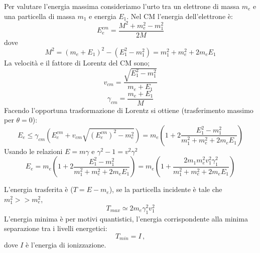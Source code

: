 \documentclass[twoside]{article}
\begin{document}
Per valutare l'energia massima consideriamo l'urto tra un elettrone di massa $m_e$ e una particella di massa $m_1$ e energia $E_1$. Nel CM l'energia dell'elettrone è:
\begin{equation}
    E_e^{cm}=\frac{M^2+m_e^2-m_1^2}{2M}
\end{equation}
dove
\begin{equation*}
    M^2=(m_e+E_1)^2-(E_1^2-m_1^2)=m_1^2+m_e^2+2m_eE_1
\end{equation*}
La velocità e il fattore di Lorentz del CM sono;
\begin{equation}
    v_{cm}=\frac{\sqrt{E_1^2-m_1^2}}{m_e+E_1}
\end{equation}
\begin{equation}
    \gamma_{cm}=\frac{m_e+E_1}{M}
\end{equation}
Facendo l'opportuna trasformazione di Lorentz si ottiene (trasferimento massimo per $\theta=0$):
\begin{equation}
    E_e \le \gamma_{cm} (E_e^{cm}+ v_{cm}\sqrt{(E_e^{cm})^2-m_e^2})=m_e \left( 1+ 2\frac{E_1^2-m_1^2}{m_1^2+m_e^2+2m_eE_1} \right)
\end{equation}
Usando le relazioni $E=m\gamma$ e $\gamma^2-1=v^2\gamma^2$
\begin{equation}
    E_e= m_e \left( 1+ 2\frac{E_1^2-m_1^2}{m_1^2+m_e^2+2m_eE_1} \right) = m_e \left( 1+ \frac{2m_1m_e^2v_1^2\gamma_1^2}{m_1^2+m_e^2+2m_eE_1}  \right)
\end{equation}

L'energia trasferita è ($T=E-m_e$), se la particella incidente è tale che $m_1^2>>m_e^2$, 
\begin{equation}
    T_{max}\simeq 2m_e \gamma_1^2 v_1^2
\end{equation}
L'energia minima è per motivi quantistici, l'energia corrispondente alla minima separazione tra i livelli energetici:
\begin{equation}
T_{min}=I \, , 
\end{equation}
dove $I$ è l'energia di ionizzazione.
\end{document}
